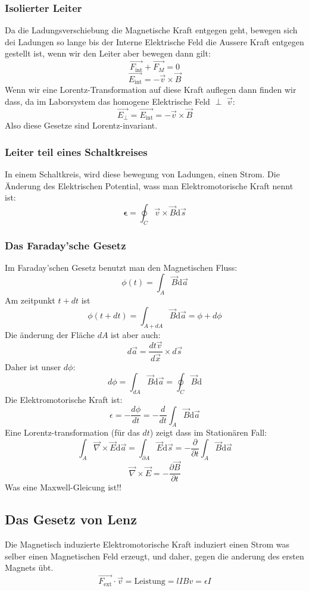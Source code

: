 \documentclass{article}
\begin{document}
\subsubsection*{Isolierter Leiter}
Da die Ladungsverschiebung die Magnetische Kraft entgegen geht, bewegen sich dei Ladungen so lange bis der Interne Elektrische Feld die Aussere Kraft entgegen gestellt ist, wenn wir den Leiter aber bewegen dann gilt:
\[\vec{F_{\text{int}}}+\vec{F_M}=0\]
\[\vec{E_{\text{int}}}=-\vec{v}\times \vec{B }\]
Wenn wir eine Lorentz-Transformation auf diese Kraft auflegen dann finden wir dass, da im Laborsystem das homogene Elektrische Feld $\perp$ $\vec{v}$:
\[\vec{E_\perp}=\vec{E_\text{int}}=-\vec{v}\times \vec{B }\]
Also diese Gesetze sind Lorentz-invariant.
\subsubsection*{Leiter teil eines Schaltkreises}
In einem Schaltkreis, wird diese bewegung von Ladungen, einen Strom. Die Änderung des Elektrischen Potential, wass man Elektromotorische Kraft nennt ist:
\[\mathbf{\epsilon}=\oint^{}_{C }\vec{v}\times \vec{B }\text{d}\vec{s}\]
\subsubsection*{Das Faraday'sche Gesetz}
Im Faraday'schen Gesetz benutzt man den Magnetischen Fluss:
\[\phi(t)=\int^{}_{A}\vec{B }\text{d}\vec{a}\]
Am zeitpunkt $t+dt$ ist \[\phi(t+dt)=\int^{}_{A+dA}\vec{B }\text{d}\vec{a}=\phi+d\phi\]
Die änderung der Fläche $dA$ ist aber auch:
\[d \vec{a}=\frac{dt \vec{v}}{d \vec{x}}\times d \vec{s}\]
Daher ist unser $d\phi$:
\[d\phi=\int^{}_{dA}\vec{B }\text{d}\vec{a}=\oint^{}_{C }\vec{B }\text{d}\]
Die Elektromotorische Kraft ist:
\[\epsilon = -\frac{d\phi}{dt}=-\frac{d }{dt}\int^{}_{A}\vec{B }\text{d}\vec{a}\]
Eine Lorentz-transformation (für das $dt$) zeigt dass im Stationären Fall:
\[\int^{}_{A}\vec{\nabla}\times \vec{E}\text{d}\vec{a}=\int^{}_{\partial A}\vec{E }\text{d}\vec{s}=-\frac{\partial}{\partial t} \int^{}_{A}\vec{B }\text{d}\vec{a}\]
\[\boxed{\vec{\nabla}\times \vec{E}=-\frac{\partial \vec{B}}{\partial t} }\]
Was eine Maxwell-Gleicung ist!!
\subsection*{Das Gesetz von Lenz}
Die Magnetisch induzierte Elektromotorische Kraft induziert einen Strom was selber einen Magnetischen Feld erzeugt, und daher, gegen die anderung des ersten Magnets übt.
\[\vec{F_\text{ext}}\cdot \vec{v}=\text{Leistung}=lIBv= \epsilon I\]
\end{document}
